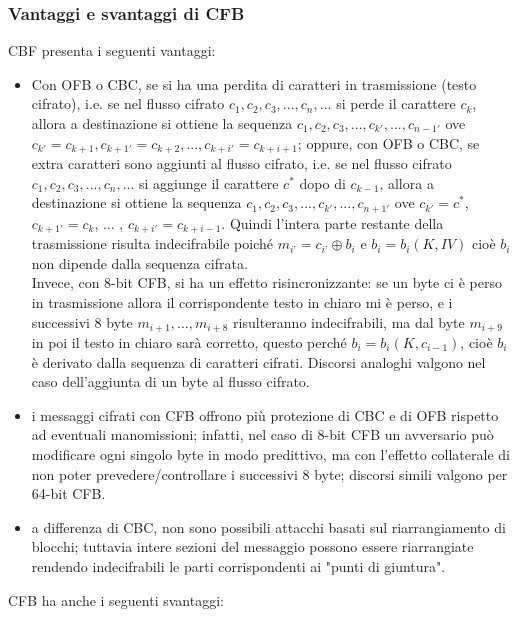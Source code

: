 \subsubsection{Vantaggi e svantaggi  di CFB}
CBF presenta i seguenti vantaggi:
\begin{itemize}
\item Con OFB o CBC, se si ha una perdita di caratteri in trasmissione (testo cifrato), i.e. se nel flusso cifrato $c_{1}, c_{2}, c_{3}, ... , c_{n}, ...$ si perde il carattere $c_{k}$, allora a destinazione si ottiene la sequenza $c_{1}, c_{2}, c_{3}, ... , c_{k'}, ... , c_{n-1'}$ ove $c_{k'} = c_{k+1}, c_{k+1'} = c_{k+2}, ... , c_{k+i'} = c_{k+i+1}$; oppure, con OFB o CBC, se extra caratteri sono aggiunti al flusso cifrato, i.e. se nel flusso cifrato $c_{1}, c_{2}, c_{3}, ... , c_{n}, ...$ si aggiunge il carattere $c^{*}$ dopo di $c_{k-1}$, allora a destinazione si ottiene la sequenza $c_{1}, c_{2}, c_{3}, ... , c_{k'}, ... , c_{n+1'}$ ove $c_{k'} = c^{*}$, $c_{k+1'} = c_{k}$, $...$ , $c_{k+i'} = c_{k+i-1}$. Quindi l'intera parte restante della trasmissione risulta indecifrabile poiché $m_{i’} = c_{i’} \oplus b_{i}$ e $b_{i} = b_{i}(K, IV)$ cioè $b_{i}$ non dipende dalla sequenza cifrata. \\
Invece, con 8-bit CFB, si ha un effetto risincronizzante: se un byte ci è perso in trasmissione allora il corrispondente testo in chiaro mi è perso, e i successivi 8 byte $m_{i+1}, …, m_{i+8}$ risulteranno indecifrabili, ma dal byte $m_{i+9}$ in poi il testo in chiaro sarà corretto, questo perché $b_{i} = b_{i}(K, c_{i-1})$, cioè $b_{i}$ è derivato dalla sequenza di caratteri cifrati. Discorsi analoghi valgono nel caso dell'aggiunta di un byte al flusso cifrato.
\item i messaggi cifrati con CFB offrono più protezione di CBC e di OFB rispetto ad eventuali manomissioni; infatti, nel caso di 8-bit CFB un avversario può modificare ogni singolo byte in modo predittivo, ma con l'effetto collaterale di non poter prevedere/controllare i successivi 8 byte; discorsi simili valgono per 64-bit CFB.
\item a differenza di CBC, non sono possibili attacchi basati sul riarrangiamento di blocchi; tuttavia intere sezioni del messaggio possono essere riarrangiate rendendo indecifrabili le parti corrispondenti ai "punti di giuntura".
\end{itemize}
CFB ha anche i seguenti svantaggi:

